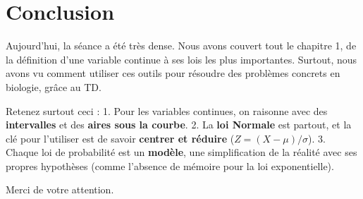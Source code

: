 \documentclass[12pt, a4paper]{article}
\begin{document}
\section*{Conclusion}
Aujourd'hui, la séance a été très dense. Nous avons couvert tout le chapitre 1, de la définition d'une variable continue à ses lois les plus importantes. Surtout, nous avons vu comment utiliser ces outils pour résoudre des problèmes concrets en biologie, grâce au TD.

Retenez surtout ceci :
1.  Pour les variables continues, on raisonne avec des \textbf{intervalles} et des \textbf{aires sous la courbe}.
2.  La \textbf{loi Normale} est partout, et la clé pour l'utiliser est de savoir \textbf{centrer et réduire} ($Z = (X-\mu)/\sigma$).
3.  Chaque loi de probabilité est un \textbf{modèle}, une simplification de la réalité avec ses propres hypothèses (comme l'absence de mémoire pour la loi exponentielle).

Merci de votre attention.
\end{document}
